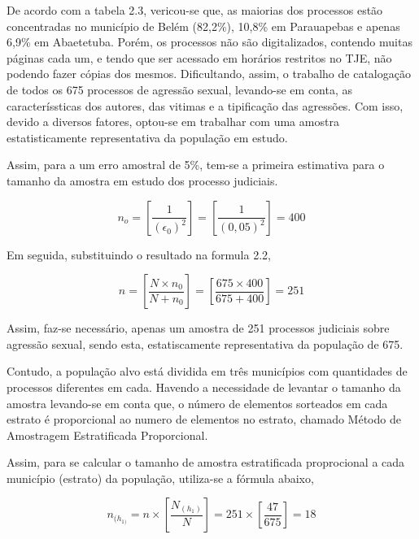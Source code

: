 De acordo com a tabela 2.3, vericou-se que, as maiorias dos processos estão
concentradas no município de Belém (82,2\%), 10,8\% em Parauapebas e apenas 6,9\%
em Abaetetuba. Porém, os processos não são digitalizados, contendo muitas páginas
cada um, e tendo que ser acessado em horários restritos no TJE, não podendo fazer
cópias dos mesmos. Dificultando, assim, o trabalho de catalogação de todos os 675
processos de agressão sexual, levando-se em conta, as caracteríssticas dos autores, das
vitimas e a tipificação das agressões. Com isso, devido a diversos fatores, optou-se
em trabalhar com uma amostra estatisticamente representativa da população em estudo.
\vskip0.3cm

Assim, para a um erro amostral de 5\%, tem-se a primeira estimativa para o tamanho da amostra em estudo dos processo judiciais.

\begin{equation}\label{nzero}
    n_{o}= \left[\frac{1}{\left(\epsilon_{0}\right)^2}\right] = \left[\frac{1}{\left(0,05
    \right)^2}\right]=400
\end{equation}

Em seguida, substituindo o resultado na formula 2.2,

\begin{equation}\label{nzero2}
    n=\left[\frac{N \times n_{0}}{N + n_{0}}\right]=
    \left[\frac{675 \times 400}{675 + 400}\right]=251
\end{equation}

Assim, faz-se necessário, apenas um amostra de 251 processos judiciais sobre
agressão sexual, sendo esta, estatiscamente representativa da população de 675.
\vskip0.3cm

Contudo, a população alvo está dividida em três municípios com quantidades
de processos diferentes em cada. Havendo a necessidade de levantar o tamanho da
amostra levando-se em conta que, o número de elementos sorteados em cada estrato
é proporcional ao numero de elementos no estrato, chamado Método de Amostragem
Estratificada Proporcional.

\newpage
Assim, para se calcular o tamanho de amostra estratificada proprocional a cada
município (estrato) da população, utiliza-se a fórmula abaixo,




$$
n_{(h_{1)}}= n \times  \left[\frac{N_{(h_{1})}}{N} \right]= 251 \times \left[\frac{47}{675}\right]= 18
$$

